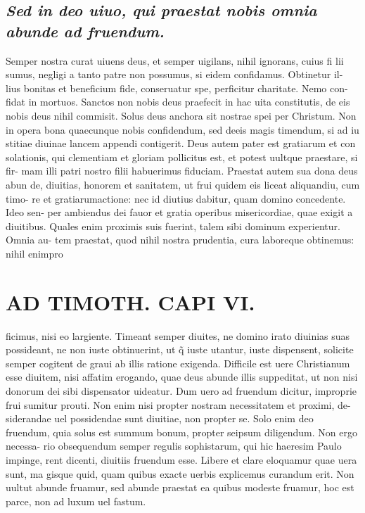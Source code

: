 \documentclass{article}
\begin{document}
\begin{pages}
\subsection*{\textit{Sed in deo uiuo, qui praestat nobis omnia abunde ad fruendum. }}\pstart Semper nostra curat uiuens deus, et semper uigilans, nihil ignorans, cuius fi lii sumus, negligi a tanto patre non possumus, si eidem confidamus. Obtinetur il- lius bonitas et beneficium fide, conseruatur spe, perficitur charitate. Nemo con- fidat in mortuos. Sanctos non nobis deus praefecit in hac uita constitutis, de eis nobis deus nihil commisit. Solus deus anchora sit nostrae spei per Christum. Non in opera bona quaecunque nobis confidendum, sed deeis magis timendum, si ad iu stitiae diuinae lancem appendi contigerit. Deus autem pater est gratiarum et con solationis, qui clementiam et gloriam pollicitus est, et potest uultque praestare, si fir- mam illi patri nostro filii habuerimus fiduciam. Praestat autem sua dona deus abun de, diuitias, honorem et sanitatem, ut frui quidem eis liceat aliquandiu, cum timo- re et gratiarumactione: nec id diutius dabitur, quam domino concedente. Ideo sen- per ambiendus dei fauor et gratia operibus misericordiae, quae exigit a diuitibus. Quales enim proximis suis fuerint, talem sibi dominum experientur. Omnia au- tem praestat, quod nihil nostra prudentia, cura laboreque obtinemus: nihil enimpro  \pend
{}
{}
\subsection*{\textit{}}
\section*{AD TIMOTH. CAPI VI. }
\marginpar{[ p.541 ]}\pstart ficimus, nisi eo largiente. Timeant semper diuites, ne domino irato diuinias suas possideant, ne non iuste obtinuerint, ut q̃ iuste utantur, iuste dispensent, solicite semper cogitent de graui ab illis ratione exigenda. Difficile est uere Christianum esse diuitem, nisi affatim erogando, quae deus abunde illis suppeditat, ut non nisi donorum dei sibi dispensator uideatur. Dum uero ad fruendum dicitur, improprie frui sumitur prouti. Non enim nisi propter nostram necessitatem et proximi, de- siderandae uel possidendae sunt diuitiae, non propter se. Solo enim deo fruendum, quia solus est summum bonum, propter seipsum diligendum. Non ergo necessa- rio obsequendum semper regulis sophistarum, qui hic haeresim Paulo impinge, rent dicenti, diuitiis fruendum esse. Libere et clare eloquamur quae uera sunt, ma gisque quid, quam quibus exacte uerbis explicemus curandum erit. Non uultut abunde fruamur, sed abunde praestat ea quibus modeste fruamur, hoc est parce, non ad luxum uel fastum.  \pend
{}
{}

\end{pages}
\end{document}

